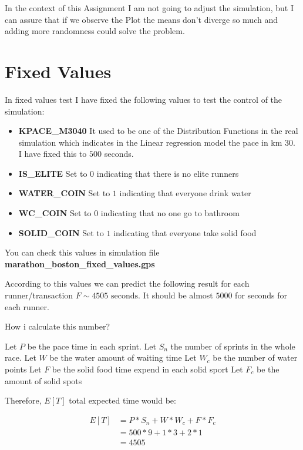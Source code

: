 \documentclass[12pt, a4paper]{article}
\begin{document}
In the context of this Assignment I am not going to adjust the simulation, but
I can assure that if we observe the Plot the means don't diverge so much and
adding more randomness could solve the problem.


\section{Fixed Values}
In fixed values test I have fixed the following values to test the control of
the simulation:

\begin{itemize}
  \item \textbf{KPACE\_M3040} It used to be one of the Distribution Functions in
    the real simulation which indicates in the Linear regression model the pace
    in km 30. I have fixed this to $500$ seconds.
  \item \textbf{IS\_ELITE} Set to $0$ indicating that there is no elite runners
  \item \textbf{WATER\_COIN} Set to $1$ indicating that everyone drink water
  \item \textbf{WC\_COIN} Set to $0$ indicating that no one go to bathroom 
  \item \textbf{SOLID\_COIN} Set to $1$ indicating that everyone take solid food
\end{itemize}

You can check this values in simulation file \textbf{marathon\_boston\_fixed\_values.gps}

According to this values we can predict the following result for each
runner/transaction $F \sim 4505 \text{ seconds}$. It should be almost $5000$ for
seconds for each runner.

How i calculate this number?

Let $P$ be the pace time in each sprint.
Let $S_n$ the number of sprints in the whole race.
Let $W$ be the water amount of waiting time
Let $W_c$ be the number of water points
Let $F$ be the solid food time expend in each solid sport
Let $F_c$ be the amount of solid spots

Therefore, $E[T]$ total expected time would be:

\begin{equation}
  \begin{aligned}
  E[T] &= P*S_n+W*W_c+F*F_c\\
       &= 500*9+1*3+2*1\\
       &= 4505
  \end{aligned}
\end{equation}
\end{document}
